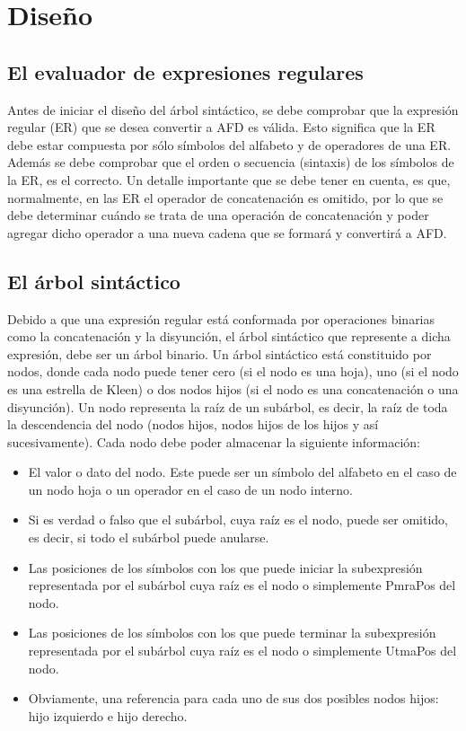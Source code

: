 \documentclass[a4paper,10pt]{article}
\begin{document}
 
\section{Diseño}
\subsection{El evaluador de expresiones regulares}
Antes de iniciar el diseño del árbol sintáctico, se debe comprobar que la expresión regular (ER) que se desea convertir a AFD es válida. 
Esto significa que la ER debe estar compuesta por sólo símbolos del alfabeto y de operadores de una ER. 
Además se debe comprobar que el orden o secuencia (sintaxis) de los símbolos de la ER, es el correcto. 
Un detalle importante que se debe tener en cuenta, es que, normalmente, en las ER el operador de concatenación es omitido, por lo que se debe
determinar cuándo se trata de una operación de concatenación y poder agregar dicho operador a una nueva cadena que se formará y convertirá a
AFD.


\subsection{El árbol sintáctico}
Debido a que una expresión regular está conformada por operaciones binarias como la concatenación y la disyunción, el árbol sintáctico que
represente a dicha expresión, debe ser un árbol binario.
Un árbol sintáctico está constituido por nodos, donde cada nodo puede tener cero (si el nodo es una hoja), uno (si el nodo es una estrella de Kleen)
o dos nodos hijos (si el nodo es una concatenación o una disyunción).
Un nodo representa la raíz de un subárbol, es decir, la raíz de toda la descendencia del nodo (nodos hijos, nodos hijos de los hijos y así
sucesivamente).
Cada nodo debe poder almacenar la siguiente información:
\begin{itemize}
 \item El valor o dato del nodo. Este puede ser un símbolo del alfabeto en
el caso de un nodo hoja o un operador en el caso de un nodo interno.
\item Si es verdad o falso que el subárbol, cuya raíz es el nodo, puede ser
omitido, es decir, si todo el subárbol puede anularse. 
\item Las posiciones de los símbolos con los que puede iniciar la subexpresión representada por el subárbol cuya raíz es el nodo o
simplemente PmraPos del nodo.
\item Las posiciones de los símbolos con los que puede terminar la subexpresión representada por el subárbol cuya raíz es el nodo o
simplemente UtmaPos del nodo.
\item Obviamente, una referencia para cada uno de sus dos posibles nodos hijos: hijo izquierdo e hijo derecho.
\end{itemize}
\end{document}
